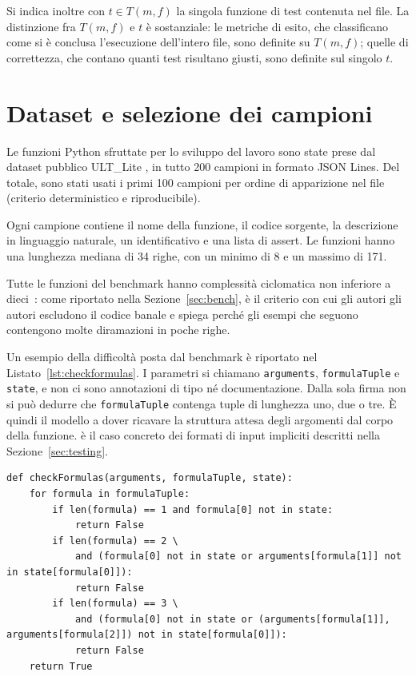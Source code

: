 Si indica inoltre con $t \in T(m, f)$ la singola funzione di test contenuta nel
file. La distinzione fra $T(m,f)$ e $t$ è sostanziale: le metriche di esito, che
classificano come si è conclusa l'esecuzione dell'intero file, sono definite su
$T(m,f)$; quelle di correttezza, che contano quanti test risultano giusti, sono
definite sul singolo $t$.

\section{Dataset e selezione dei campioni}
Le funzioni Python sfruttate per lo sviluppo del lavoro sono state prese dal dataset pubblico ULT\_Lite \cite{huang2025ult}, in tutto 200 campioni in formato JSON Lines. Del totale, sono stati usati i primi 100 campioni per ordine di apparizione nel file (criterio deterministico e riproducibile).

Ogni campione contiene il nome della funzione, il codice sorgente, la descrizione in linguaggio naturale, un identificativo e una lista di assert. Le funzioni hanno una lunghezza mediana di 34 righe, con un minimo di 8 e un massimo di 171.

Tutte le funzioni del benchmark hanno complessità ciclomatica non inferiore a
dieci~\cite{mccabe1976complexity}: come riportato nella Sezione~\ref{sec:bench},
è il criterio con cui gli autori gli autori escludono il codice banale e spiega perché gli esempi che seguono contengono molte diramazioni in poche righe.

Un esempio della difficoltà posta dal benchmark è riportato nel
Listato~\ref{lst:checkformulas}. I parametri si chiamano \texttt{arguments}, \texttt{formulaTuple} e \texttt{state}, e non ci sono annotazioni di tipo né documentazione. Dalla sola firma non si può dedurre che \texttt{formulaTuple} contenga tuple di lunghezza uno, due o tre. È quindi il modello a dover ricavare la struttura attesa degli argomenti dal corpo della funzione. è il caso concreto
dei formati di input impliciti descritti nella Sezione~\ref{sec:testing}.

\begin{lstlisting}[float=htbp,
                   caption={Il campione 84 del dataset, \texttt{checkFormulas}.},
                   label={lst:checkformulas}]
def checkFormulas(arguments, formulaTuple, state):
    for formula in formulaTuple:
        if len(formula) == 1 and formula[0] not in state:
            return False
        if len(formula) == 2 \
            and (formula[0] not in state or arguments[formula[1]] not in state[formula[0]]):
            return False
        if len(formula) == 3 \
            and (formula[0] not in state or (arguments[formula[1]], arguments[formula[2]]) not in state[formula[0]]):
            return False
    return True
\end{lstlisting}

